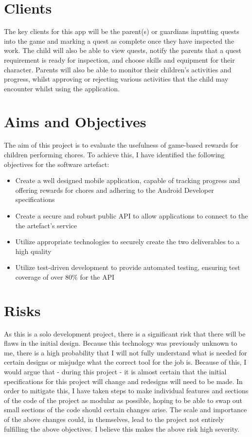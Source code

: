 \section{Clients}
The key clients for this app will be the parent(s) or guardians inputting quests into the game and marking a quest as complete once they have inspected the work. 
The child will also be able to view quests, notify the parents that a quest requirement is ready for inspection, and choose skills and equipment for their character.
Parents will also be able to monitor their children's activities and progress, whilst approving or rejecting various activities that the child may encounter whilst using the application. 

\section{Aims and Objectives}
The aim of this project is to evaluate the usefulness of game-based rewards for children performing chores. 
To achieve this, I have identified the following objectives for the software artefact:

\begin{itemize}
	\item Create a well designed mobile application, capable of tracking progress and offering rewards for chores and adhering to the Android Developer specifications
	\item Create a secure and robust public API to allow applications to connect to the the artefact's service
	\item Utilize appropriate technologies to securely create the two deliverables to a high quality
	\item Utilize test-driven development to provide automated testing, ensuring test coverage of over 80\% for the API
\end{itemize}

\section{Risks}
As this is a solo development project, there is a significant risk that there will be flaws in the initial design. 
Because this technology was previously unknown to me, there is a high probability that I will not fully understand what is needed for certain designs or misjudge what the correct tool for the job is.
Because of this, I would argue that - during this project - it is almost certain that the initial specifications for this project will change and redesigns will need to be made.
In order to mitigate this, I have taken steps to make individual features and sections of the code of the project as modular as possible, hoping to be able to swap out small sections of the code should certain changes arise.
The scale and importance of the above changes could, in themselves, lead to the project not entirely fulfilling the above objectives. I believe this makes the above risk high severity.

